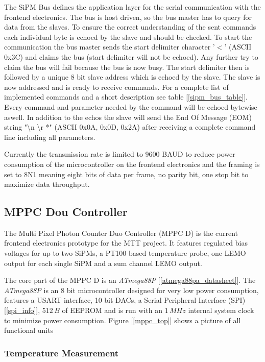 The SiPM Bus defines the application layer for the serial communication with the frontend electronics. The bus is host driven, so the bus master has to query for data from the slaves.
To ensure the correct understanding of the sent commands each individual byte is echoed by the slave and should be checked. To start the communication the bus master sends the start
delimiter character '$<$' (ASCII 0x3C) and claims the bus (start delimiter will not be echoed). Any further try to claim the bus will fail because the bus is now busy. 
The start delimiter then is followed by a unique 8 bit slave address which is echoed by the slave. The slave is now addressed and is ready to receive commands. For a complete list of
implemented commands and a short description see table [\ref{sipm_bus_table}]. Every command and parameter needed by the command will be echoed bytewise aswell. In addition to the echos 
the slave will send the End Of Message (EOM) string "\textbackslash n \textbackslash r *" (ASCII 0x0A, 0x0D, 0x2A) after receiving a complete command line including all parameters.

Currently the transmission rate is limited to 9600 BAUD to reduce power consumption of the microcontroller on the frontend electronics and the framing is set to 8N1 meaning eight bits of data per frame,
no parity bit, one stop bit to maximize data throughput.

\subsection{MPPC Dou Controller}

The Multi Pixel Photon Counter Duo Controller (MPPC D) is the current frontend electronics prototype for the MTT project. It features regulated bias voltages for up to two SiPMs, a PT100 based temperature
probe, one LEMO output for each single SiPM and a sum channel LEMO output.

The core part of the MPPC D is an \emph{ATmega88P} [\ref{atmega88pa_datasheet}]. The \emph{ATmega88P} is an 8 bit microcontroller designed for very low power consumption, features a USART interface,
10 bit DACs, a Serial Peripheral Interface (SPI) [\ref{spi_info}], $512\,B$ of EEPROM and is run with an $1\,MHz$ internal system clock to minimize power consumption. Figure [\ref{mppc_top}] shows a picture
of all functional units 
\subsubsection{Temperature Measurement}
